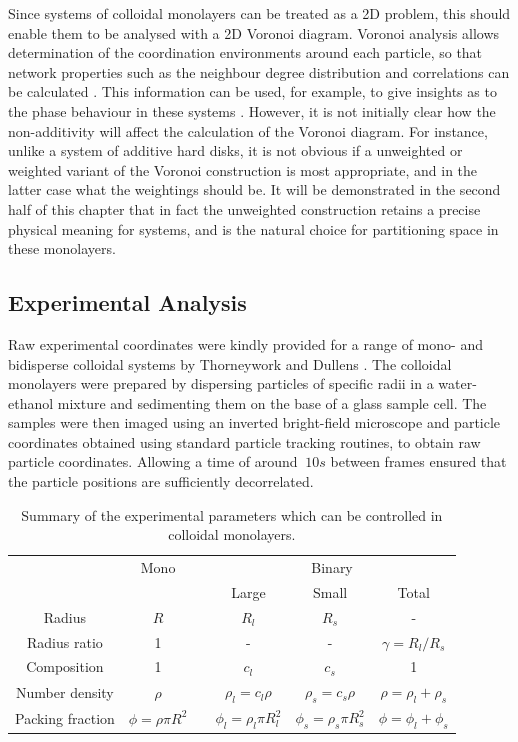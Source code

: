 Since systems of colloidal monolayers can be treated as a 2D problem, this should enable them to be analysed with a 2D Voronoi diagram.
Voronoi analysis allows determination of the coordination environments around each particle, so that network properties such as the neighbour degree distribution and correlations can be calculated \cite{Earnshaw1994,Yang2002,Kumar2005,Chremos2007}.
This information can be used, for example, to give insights as to the phase behaviour in these systems \cite{Jaster1999,Pronk2004,Kapfer2015,Thorneywork2017}.
However, it is not initially clear how the non\--additivity will affect the calculation of the Voronoi diagram.
For instance, unlike a system of additive hard disks, it is not obvious if a unweighted or weighted variant of the Voronoi construction is most appropriate, and in the latter case what the weightings should be.
It will be demonstrated in the second half of this chapter that in fact the unweighted construction retains a precise physical meaning for \qtd{} systems, and is the natural choice for partitioning space in these monolayers.

\subsection{Experimental Analysis}

Raw experimental coordinates were kindly provided for a range of mono\-- and bidisperse colloidal systems by Thorneywork and Dullens \cite{Thorneywork2014,Thorneywork2017,alice2015a}.
The colloidal monolayers were prepared by dispersing particles of specific radii in a water\--ethanol mixture and sedimenting them on the base of a glass sample cell.
The samples were then imaged using an inverted bright-field microscope and particle coordinates obtained using standard particle tracking routines, to obtain raw particle coordinates.
Allowing a time of around $~10s$ between frames ensured that the particle positions are sufficiently decorrelated. 

\begin{table}
\centering
\caption{Summary of the experimental parameters which can be controlled in colloidal monolayers.}
\label{tab:expcolloidparams}
\begin{tabular}{@{}cccccc@{}}
\toprule
& \multicolumn{1}{c}{Mono} & \phantom{x} & \multicolumn{3}{c}{Binary} \\ 
\cmidrule{2-2} \cmidrule{4-6} 
& & & Large & Small & Total \\ 
\midrule
Radius & $R$ & & $R_l$ & $R_s$ & - \\
Radius ratio & 1 & & - & - & $\gamma=R_l/R_s$ \\
Composition & 1 & & $c_l$ & $c_s$ & 1 \\
Number density & $\rho$ & & $\rho_l=c_l\rho$ & $\rho_s=c_s\rho$ & $\rho=\rho_l+\rho_s$ \\
Packing fraction & $\phi=\rho\pi R^2$ & & $\phi_l=\rho_l\pi R_l^2$ & $\phi_s=\rho_s\pi R_s^2$ & $\phi=\phi_l+\phi_s$ \\
\bottomrule
\end{tabular}
\end{table}

